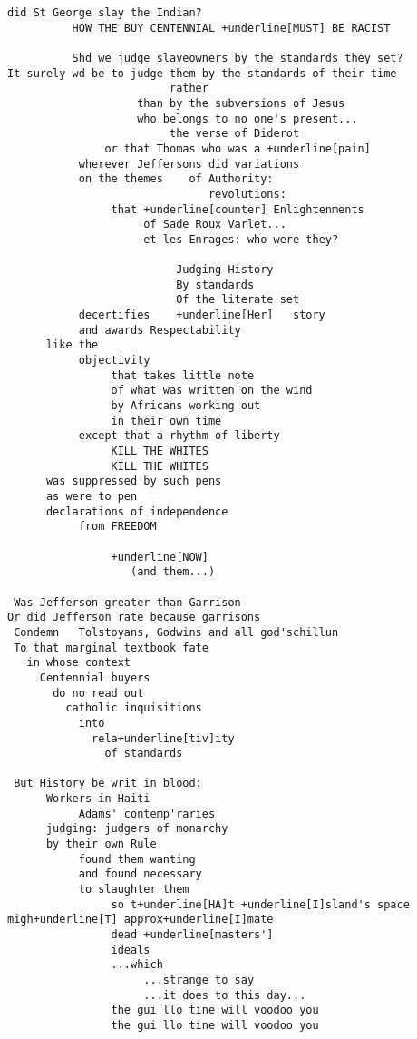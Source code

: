 \begin{Verbatim}[commandchars=+\[\]]
                    did St George slay the Indian?
          HOW THE BUY CENTENNIAL +underline[MUST] BE RACIST
          
          Shd we judge slaveowners by the standards they set?
It surely wd be to judge them by the standards of their time
                         rather
                    than by the subversions of Jesus
                    who belongs to no one's present...
                         the verse of Diderot
               or that Thomas who was a +underline[pain]
           wherever Jeffersons did variations
           on the themes    of Authority:
                               revolutions:
                that +underline[counter] Enlightenments
                     of Sade Roux Varlet...
                     et les Enrages: who were they?
                     
                          Judging History
                          By standards
                          Of the literate set
           decertifies    +underline[Her]   story
           and awards Respectability
      like the
           objectivity
                that takes little note
                of what was written on the wind
                by Africans working out
                in their own time
           except that a rhythm of liberty
                KILL THE WHITES
                KILL THE WHITES
      was suppressed by such pens
      as were to pen
      declarations of independence
           from FREEDOM
           
                +underline[NOW]
                   (and them...)
                   
 Was Jefferson greater than Garrison
Or did Jefferson rate because garrisons
 Condemn   Tolstoyans, Godwins and all god'schillun
 To that marginal textbook fate
   in whose context
     Centennial buyers
       do no read out
         catholic inquisitions
           into
             rela+underline[tiv]ity
               of standards
 
 But History be writ in blood:
      Workers in Haiti
           Adams' contemp'raries
      judging: judgers of monarchy
      by their own Rule
           found them wanting
           and found necessary
           to slaughter them
                so t+underline[HA]t +underline[I]sland's space migh+underline[T] approx+underline[I]mate
                dead +underline[masters']
                ideals
                ...which
                     ...strange to say
                     ...it does to this day...
                the gui llo tine will voodoo you
                the gui llo tine will voodoo you
                

\end{Verbatim}
